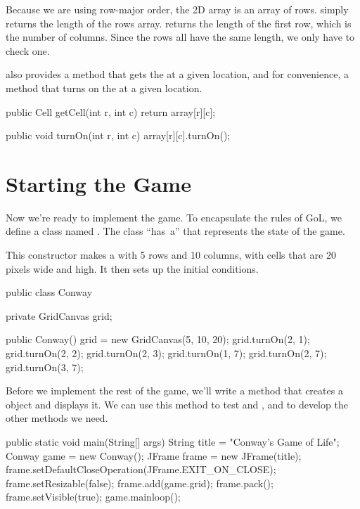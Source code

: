 Because we are using row-major order, the 2D array is an array of rows.
 simply returns the length of the rows array.
 returns the length of the first row, which is the number of columns.
Since the rows all have the same length, we only have to check one.

 also provides a method that gets the  at a given location, and for convenience, a method that turns on the  at a given location.

\begin{code}
public Cell getCell(int r, int c) {
    return array[r][c];
}

public void turnOn(int r, int c) {
    array[r][c].turnOn();
}
\end{code}


\section{Starting the Game}
\label{conwaymain}

Now we're ready to implement the game.
To encapsulate the rules of GoL, we define a class named .
The  class ``has~a''  that represents the state of the game.

This constructor makes a  with 5 rows and 10 columns, with cells that are 20 pixels wide and high.
It then sets up the initial conditions.

\begin{code}
public class Conway {
    private GridCanvas grid;

    public Conway() {
        grid = new GridCanvas(5, 10, 20);
        grid.turnOn(2, 1);
        grid.turnOn(2, 2);
        grid.turnOn(2, 3);
        grid.turnOn(1, 7);
        grid.turnOn(2, 7);
        grid.turnOn(3, 7);
    }
}
\end{code}


Before we implement the rest of the game, we'll write a  method that creates a  object and displays it.
We can use this method to test  and , and to develop the other methods we need.

\begin{code}
public static void main(String[] args) {
    String title = "Conway's Game of Life";
    Conway game = new Conway();
    JFrame frame = new JFrame(title);
    frame.setDefaultCloseOperation(JFrame.EXIT_ON_CLOSE);
    frame.setResizable(false);
    frame.add(game.grid);
    frame.pack();
    frame.setVisible(true);
    game.mainloop();
}
\end{code}

